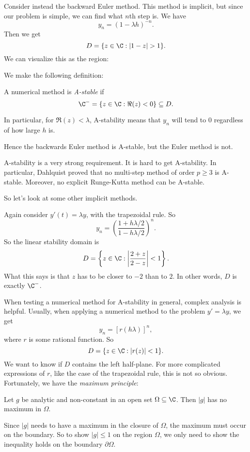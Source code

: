 \documentclass[a4paper]{article}
\begin{document}
\begin{eg}
  Consider instead the backward Euler method. This method is implicit, but since our problem is simple, we can find what $n$th step is. We have
  \[
    y_n = (1 - \lambda h)^{-n}.
  \]
  Then we get
  \[
    D = \{z \in \C: |1 - z| > 1\}.
  \]
  We can visualize this as the region:
  \begin{center}
  \end{center}
\end{eg}
We make the following definition:
\begin{defi}[A-stability]
  A numerical method is \emph{A-stable} if
  \[
    \C^- = \{z \in \C: \Re(z) < 0\} \subseteq D.
  \]
\end{defi}
In particular, for $\Re(z) < \lambda$, A-stability means that $y_n$ will tend to $0$ regardless of how large $h$ is.

Hence the backwards Euler method is A-stable, but the Euler method is not.

A-stability is a very strong requirement. It is hard to get A-stability. In particular, Dahlquist proved that no multi-step method of order $p \geq 3$ is A-stable. Moreover, no explicit Runge-Kutta method can be A-stable.

So let's look at some other implicit methods.
\begin{eg}
  Again consider $y'(t) = \lambda y$, with the trapezoidal rule. So
  \[
    y_n = \left(\frac{1 + h\lambda/2}{1 - h\lambda/2}\right)^n.
  \]
  So the linear stability domain is
  \[
    D = \left\{z \in \C: \left|\frac{2 + z}{2 - z}\right| < 1 \right\}.
  \]
  What this says is that $z$ has to be closer to $-2$ than to $2$. In other words, $D$ is exactly $\C^-$.
\end{eg}

When testing a numerical method for A-stability in general, complex analysis is helpful. Usually, when applying a numerical method to the problem $y' = \lambda y$, we get
\[
  y_n = [r(h\lambda)]^n,
\]
where $r$ is some rational function. So
\[
  D = \{z \in \C: |r(z)| < 1\}.
\]
We want to know if $D$ contains the left half-plane. For more complicated expressions of $r$, like the case of the trapezoidal rule, this is not so obvious. Fortunately, we have the \emph{maximum principle}:
\begin{thm}
  Let $g$ be analytic and non-constant in an open set $\Omega \subseteq \C$. Then $|g|$ has no maximum in $\Omega$.
\end{thm}
Since $|g|$ needs to have a maximum in the closure of $\Omega$, the maximum must occur on the boundary. So to show $|g| \leq 1$ on the region $\Omega$, we only need to show the inequality holds on the boundary $\partial \Omega$.
\end{document}
